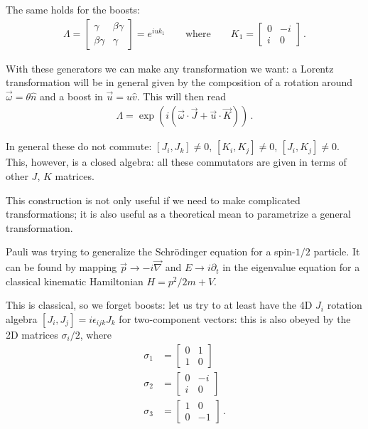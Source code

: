 \documentclass[main.tex]{subfiles}
\begin{document}
The same holds for the boosts: 
%
\begin{align}
\Lambda = \left[\begin{array}{cc}
\gamma  & \beta \gamma  \\ 
\beta \gamma  & \gamma 
\end{array}\right] 
= e^{i u k_1 }
\qquad \text{where} \qquad
K_1 = \left[\begin{array}{cc}
0 & -i \\ 
i & 0
\end{array}\right]
\,.
\end{align}

With these generators we can make any transformation we want: 
a Lorentz transformation will be in general given by the composition
of a rotation around \(\vec{\omega} = \theta \hat{n}\) and a boost in \(\vec{u} = u \hat{v}\). 
This will then read 
%
\begin{align}
\Lambda = \exp(i \left(\vec{\omega } \cdot \vec{J} + \vec{u} \cdot \vec{K}\right))
\,.
\end{align}

In general these do not commute: 
\([J_i, J_k] \neq 0\), \([K_i, K_j] \neq 0\), \([J_i, K_j] \neq 0\). 
This, however, is a closed algebra: all these commutators are given in terms of other \(J\), \(K\) matrices.

This construction is not only useful if we need to make complicated transformations; 
it is also useful as a theoretical mean to parametrize a general transformation. 

Pauli was trying to generalize the Schrödinger equation for a spin-\(1/2\) particle. 
It can be found by mapping \(\vec{p} \to -i \vec{\nabla}\) and \(E \to i \partial_t\) in the 
eigenvalue equation for a classical kinematic Hamiltonian \(H = p^2 / 2m + V\). 

This is classical, so we forget boosts: let us try to at least have the 4D \(J_i\) rotation algebra 
\([J_i, J_j] = i \epsilon_{ijk}J_k\)
for two-component vectors: this is also obeyed by the 2D matrices \(\sigma_i / 2\), where 
%
\begin{align}
\sigma_1 &= \left[\begin{array}{cc}
0 & 1 \\ 
1 & 0
\end{array}\right]  \\
\sigma_2 &= \left[\begin{array}{cc}
0 & -i \\ 
i & 0
\end{array}\right]  \\
\sigma _3 &= \left[\begin{array}{cc}
1 & 0 \\ 
0 & -1
\end{array}\right]
\,.
\end{align}
\end{document}

